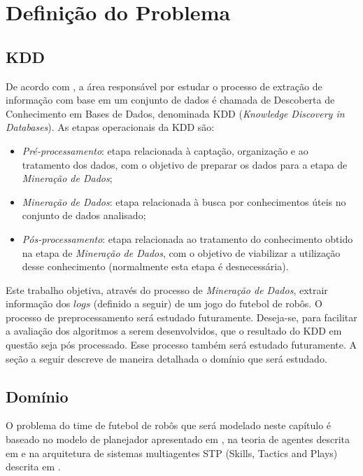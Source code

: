 \chapter{Definição do Problema}\label{cap:def_problema}

\section{KDD}

De acordo com \cite{passos2005datamining}, a área responsável por estudar o processo
de extração de informação com base em um conjunto de dados é chamada de Descoberta
de Conhecimento em Bases de Dados, denominada KDD (\textit{Knowledge Discovery in
Databases}). As etapas operacionais da KDD são:

\begin{itemize}
  \item \textit{Pré-processamento}: etapa relacionada à captação,
        organização e ao tratamento dos dados, com o objetivo de
        preparar os dados para a etapa de \textit{Mineração de Dados};
  \item \textit{Mineração de Dados}: etapa relacionada à busca por
        conhecimentos úteis no conjunto de dados analisado;
  \item \textit{Pós-processamento}: etapa relacionada ao tratamento do
        conhecimento obtido na etapa de \textit{Mineração de Dados}, com
        o objetivo de viabilizar a utilização desse conhecimento
        (normalmente esta etapa é desnecessária).
\end{itemize}

Este trabalho objetiva, através do processo de \textit{Mineração de Dados}, extrair
informação dos $logs$ (definido a seguir) de um jogo do futebol de robôs. O
processo de preprocessamento será estudado futuramente. Deseja-se, para facilitar
a avaliação dos algoritmos a serem desenvolvidos, que o resultado do KDD em questão
seja pós processado. Esse processo também será estudado futuramente. A seção a
seguir descreve de maneira detalhada o domínio que será estudado.

\section{Domínio}

O problema do time de futebol de robôs que será modelado neste capítulo é baseado
no modelo de planejador apresentado em \cite{zickler}, na teoria de agentes descrita
em \cite{russellnorvig} e na arquitetura de sistemas multiagentes
STP (Skills, Tactics and Plays) descrita em \cite{bowling2003plays}.




